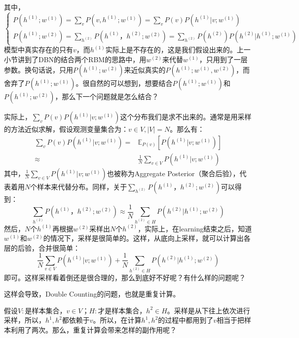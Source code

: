 \documentclass[a4paper]{article}
\begin{document}
其中，
$$
\left\{
\begin{array}{ll}
       P(h^{(1)};w^{(1)}) = \sum_v P(v, h^{(1)};w^{(1)}) = \sum_v P(v)P( h^{(1)}|v;w^{(1)}) & \\
        P(h^{(1)};w^{(2)}) = \sum_{h^{(2)}} P( h^{(1)}，h^{(2)};w^{(2)}) = \sum_{h^{(2)}} P(h^{(2)})P( h^{(2)}|h^{(1)};w^{(1)})
\end{array}
\right.
$$
模型中真实存在的只有$v$，而$h^{(1)}$实际上是不存在的，这是我们假设出来的。上一小节讲到了DBN的结合两个RBM的思路中，用$w^{(2)}$来代替$w^{(1)}$，只用到了一层参数。换句话说，只用$P(h^{(1)};w^{(2)})$来近似真实的$P(h^{(1)};w^{(1)},w^{(2)})$，而舍弃了$P(h^{(1)};w^{(1)})$。很自然的可以想到，想要结合$P(h^{(1)};w^{(1)})$和$P(h^{(1)};w^{(2)})$，那么下一个问题就是怎么结合？

实际上，$\sum_v P(v)P( h^{(1)}|v;w^{(1)})$这个分布我们是求不出来的。通常是用采样的方法近似求解，假设观测变量集合为：$v\in V,|V|=N$。那么有：
\begin{equation}
    \begin{split}
        \sum_v P(v)P( h^{(1)}|v;w^{(1)}) = & \mathbb{E}_{P(v)}[P( h^{(1)}|v;w^{(1)})] \\
        \approx & \frac{1}{N} \sum_{v\in V} P(h^{(1)}|v;w^{(1)})
    \end{split}
\end{equation}
其中，$\frac{1}{N} \sum_{v\in V} P(h^{(1)}|v;w^{(1)})$也被称为Aggregate Posterior（聚合后验），代表着用$N$个样本来代替分布。同样，关于$\sum_{h^{(2)}} P( h^{(1)}，h^{(2)};w^{(2)})$可以得到：
\begin{equation}
    \sum_{h^{(2)}} P( h^{(1)}，h^{(2)};w^{(2)}) \approx
    \frac{1}{N} \sum_{h^{(2)}\in H} P(h^{(2)}|h^{(1)};w^{(2)})
\end{equation}
然后，$N$个$h^{(1)}$再根据$w^{(2)}$采样出$N$个$h^{(2)}$，实际上，在learning结束之后，知道$w^{(1)}$和$w^{(2)}$的情况下，采样是很简单的。这样，从底向上采样，就可以计算出各层的后验，合并很简单：
\begin{equation}
\frac{1}{N} \sum_{v\in V} P(h^{(1)}|v;w^{(1)}) +   \frac{1}{N} \sum_{h^{(2)}\in H} P(h^{(2)}|h^{(1)};w^{(2)})  
\end{equation}
即可。这样采样看着倒还是很合理的，那么到底好不好呢？有什么样的问题呢？

这样会导致，Double Counting的问题，也就是重复计算。

假设$V:$是样本集合，$v\in V$；$H:$才是样本集合，$h^{2}\in H$。采样是从下往上依次进行采样，所以，$h^{1},h^{2}$都依赖于$v$。所以，在计算$h^{1},h^{2}$的过程中都用到了$v$相当于把样本利用了两次。那么，重复计算会带来怎样的副作用呢？
\end{document}
